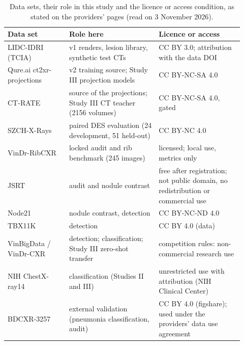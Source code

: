 \begin{table}[htbp]
\centering\small
\renewcommand{\arraystretch}{1.15}
\caption{Data sets, their role in this study and the licence or access condition, as stated on the providers' pages (read on
3 November 2026).}
\label{tab:data}
\begin{tabular}{@{}p{0.24\linewidth}p{0.35\linewidth}p{0.33\linewidth}@{}}
\toprule
Data set & Role here & Licence or access \\
\midrule
LIDC-IDRI (TCIA) & v1 renders, lesion library, synthetic test CTs & CC BY 3.0; attribution with the data DOI \\
Qure.ai ct2xr-projections & v2 training source; Study III projection models & CC BY-NC-SA 4.0 \\
CT-RATE & source of the projections; Study III CT teacher (\num{2156} volumes) & CC BY-NC-SA 4.0, gated \\
SZCH-X-Rays & paired DES evaluation (24 development, 51 held-out) & CC BY-NC 4.0 \\
VinDr-RibCXR & locked audit and rib benchmark (245 images) & licensed; local use, metrics only \\
JSRT & audit and nodule contrast & free after registration; not public domain, no redistribution or commercial use \\
Node21 & nodule contrast, detection & CC BY-NC-ND 4.0 \\
TBX11K & detection & CC BY 4.0 (data) \\
VinBigData / VinDr-CXR & detection; classification; Study III zero-shot transfer & competition rules: non-commercial research use \\
NIH ChestX-ray14 & classification (Studies II and III) & unrestricted use with attribution (NIH Clinical Center) \\
BDCXR-3257 & external validation (pneumonia classification, audit) & CC BY 4.0 (figshare); used under the providers' data use agreement \\
\bottomrule
\end{tabular}
\end{table}

